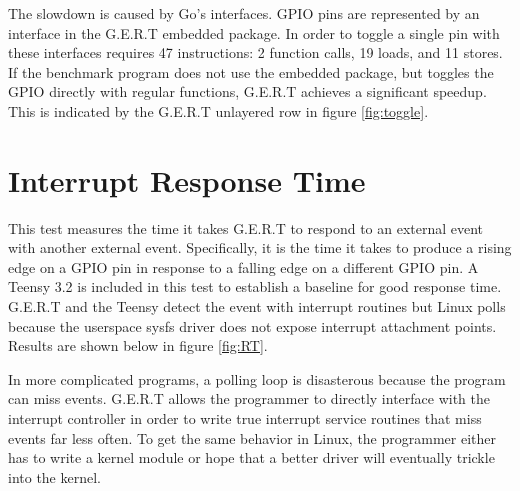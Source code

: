 The slowdown is caused by Go's
interfaces. GPIO pins are represented by an interface in the G.E.R.T embedded package.
In order to toggle a single pin with these interfaces requires 47 instructions:
2 function calls, 19 loads, and 11 stores. If the benchmark program does not use the
embedded package, but toggles the GPIO directly with regular functions,
G.E.R.T achieves a significant speedup. This is indicated by the G.E.R.T unlayered
row in figure \ref{fig:toggle}.


\section{Interrupt Response Time}\label{sec:int_time}
This test measures the time it takes G.E.R.T to respond to an external event
with another external event. Specifically, it is the time it takes to produce
a rising edge on a GPIO pin in response to a falling edge on a different GPIO pin.
A Teensy 3.2 is included in this test to establish a baseline for good
response time. G.E.R.T and the Teensy detect the event with interrupt routines
but Linux polls because the userspace sysfs driver does not expose interrupt
attachment points. Results are shown below in figure \ref{fig:RT}.

In more complicated programs, a polling loop is disasterous because the program
can miss events. G.E.R.T allows the programmer to directly interface with the
interrupt controller in order to write true interrupt service routines that miss
events far less often. To get the same behavior in Linux,
the programmer either has to write a kernel module or hope that a better driver
will eventually trickle into the kernel.


